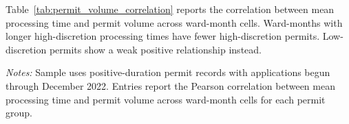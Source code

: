 Table~\ref{tab:permit_volume_correlation} reports the correlation between mean processing time and permit volume across ward-month cells.
Ward-months with longer high-discretion processing times have fewer high-discretion permits.
Low-discretion permits show a weak positive relationship instead.

\begin{table}[htbp]
    \centering
    \caption{Processing Time and Permit Volume Correlation}
    \label{tab:permit_volume_correlation}
    

    \footnotesize
    \textit{Notes:} Sample uses positive-duration permit records with applications begun through December 2022.
    Entries report the Pearson correlation between mean processing time and permit volume across ward-month cells for each permit group.
\end{table}
